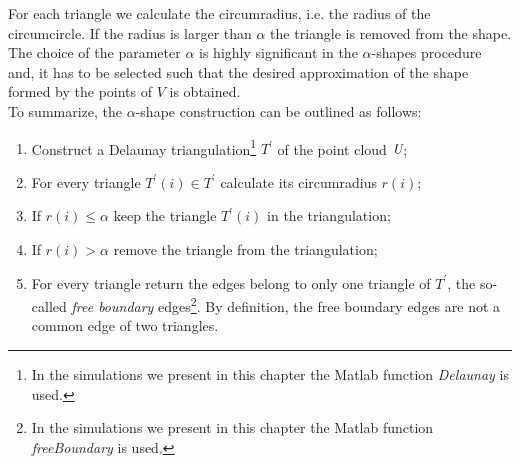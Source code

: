 For each triangle we calculate the circumradius, i.e. the radius of the circumcircle. If the radius is larger than $\alpha$ the triangle is removed from the shape. The choice of the parameter $\alpha$ is highly significant in the $\alpha$-shapes procedure and, it has to be selected such that the desired approximation of the shape formed by the points of $V$ is obtained.\\ \indent
To summarize, the $\alpha$-shape construction can be outlined as follows:
\begin{enumerate}
\item Construct a Delaunay triangulation\footnote{In the simulations we present in this chapter the Matlab function \textit{Delaunay} is used.} $T^\prime$ of the point cloud $\emph{U}$;
\item For every triangle $T^\prime(i)\in T^\prime$ calculate its circumradius $r(i)$;
\item If $r(i)\leq\alpha$ keep the triangle $T^\prime(i)$ in the triangulation;
\item If $r(i)>\alpha$ remove the triangle from the triangulation;
\item For every triangle return the edges belong to only one triangle of $T^{\prime}$, the so-called \textit{free boundary} edges\footnote{In the simulations we present in this chapter the Matlab function \textit{freeBoundary} is used.}. By definition, the free boundary edges are not a common edge of two triangles.
\end{enumerate}
